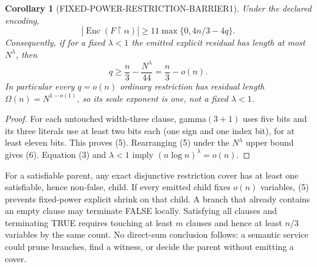 \documentclass[11pt]{article}
\newtheorem{corollary}[theorem]{Corollary}
\newcommand{\Enc}{\operatorname{Enc}}
\begin{document}
\begin{corollary}[FIXED-POWER-RESTRICTION-BARRIER1]
Under the declared encoding,
\[
 |\Enc(F\upharpoonright\alpha)|
 \ge 11\max\{0,4n/3-4q\}.                                 \tag{5}
\]
Consequently, if for a fixed $\lambda<1$ the emitted explicit residual has
length at most $N^\lambda$, then
\[
 q\ge \frac n3-\frac{N^\lambda}{44}
   =\frac n3-o(n).                                         \tag{6}
\]
In particular every $q=o(n)$ ordinary restriction has residual length
$\Omega(n)=N^{1-o(1)}$, so its scale exponent is one, not a fixed
$\lambda<1$.
\end{corollary}
\begin{proof}
For each untouched width-three clause, gamma$(3+1)$ uses five bits and its
three literals use at least two bits each (one sign and one index bit), for
at least eleven bits.  This proves (5).  Rearranging (5) under the
$N^\lambda$ upper bound gives (6).  Equation (3) and $\lambda<1$ imply
$(n\log n)^\lambda=o(n)$.
\end{proof}

For a satisfiable parent, any exact disjunctive restriction cover has at
least one satisfiable, hence non-false, child.  If every emitted child fixes
$o(n)$ variables, (5) prevents fixed-power explicit shrink on that child.
A branch that already contains an empty clause may terminate FALSE locally.
Satisfying all clauses and terminating TRUE requires touching at least $m$
clauses and hence at least $n/3$ variables by the same count.  No direct-sum
conclusion follows: a semantic service could prune branches, find a witness,
or decide the parent without emitting a cover.
\end{document}
